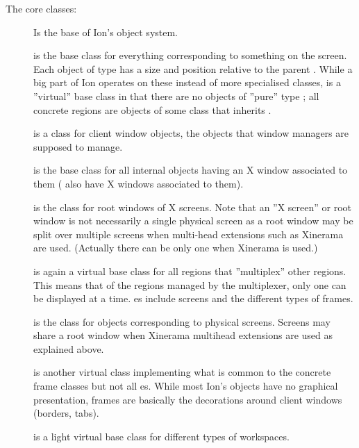 The core classes:

\begin{description}
  \item[]
    Is the base of Ion's object system.
    
  \item[]
    is the base class for everything corresponding to something on the
    screen. Each object of type  has a size and  position
    relative to the parent . While a big part of Ion 
    operates on these instead of more specialised classes, 
    is a ''virtual''  base class in that there are no objects of ''pure''
    type ; all concrete regions are objects of some class 
    that inherits .

  \item[] is a class for
    client window objects, the objects that window managers are
    supposed to manage.

  \item[] is the base class for all
    internal objects having an X window associated to them
    ( also have X windows associated to them).
    
  \item[] is the class for
    root windows of X screens.
    Note that an ''X screen'' or root window is not necessarily a
    single  physical screen as a root window
    may be split over multiple screens when multi-head extensions 
    such as Xinerama are used. (Actually there
    can be only one  when Xinerama is used.)
	
  \item[] is again a virtual base class for all regions that
    ''multiplex'' other regions. This means that of the regions managed by
    the multiplexer, only one can be displayed at a time. es 
    include screens and the different types of frames.
    
  \item[] is the class for objects
    corresponding to physical screens. Screens may share a root
    window when Xinerama multihead extensions are used as explained
    above.

  \item[] is another virtual class
    implementing what is common to the concrete frame classes but not
    all es. While most Ion's objects have no graphical 
    presentation, frames are basically the decorations around client
    windows (borders, tabs).

  \item[] is a light virtual base class
    for different types of workspaces.
\end{description}


